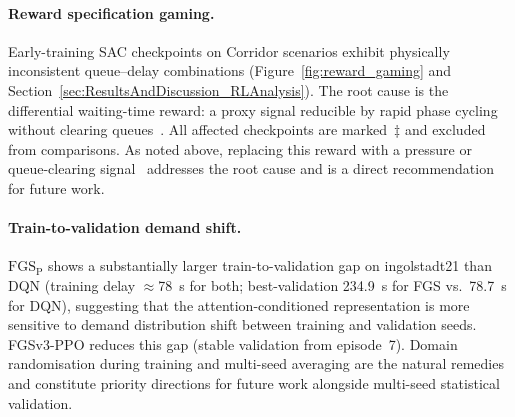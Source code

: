 \paragraph{Reward specification gaming.}
Early-training SAC checkpoints on Corridor scenarios exhibit physically inconsistent queue--delay combinations (Figure~\ref{fig:reward_gaming} and Section~\ref{sec:ResultsAndDiscussion_RLAnalysis}). The root cause is the differential waiting-time reward: a proxy signal reducible by rapid phase cycling without clearing queues~\citep{skalse2022defining}. All affected checkpoints are marked~$\ddagger$ and excluded from comparisons. As noted above, replacing this reward with a pressure or queue-clearing signal~\citep{wei2019presslight} addresses the root cause and is a direct recommendation for future work.

\paragraph{Train-to-validation demand shift.}
$\text{FGS}_\text{P}$ shows a substantially larger train-to-validation gap on ingolstadt21 than DQN (training delay $\approx$78~s for both; best-validation 234.9~s for FGS vs.\ 78.7~s for DQN), suggesting that the attention-conditioned representation is more sensitive to demand distribution shift between training and validation seeds. FGSv3-PPO reduces this gap (stable validation from episode~7). Domain randomisation during training and multi-seed averaging are the natural remedies and constitute priority directions for future work alongside multi-seed statistical validation.
